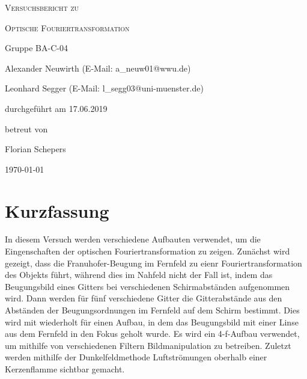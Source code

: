 \documentclass[
	a4paper,
	12pt,
	pagesize,
	ngerman
]{scrartcl}
\begin{document}
	\begin{titlepage}
		\centering
		{\scshape\LARGE Versuchsbericht zu \par}
		\vspace{1cm}
		{\scshape\huge Optische Fouriertransformation \par}
		\vspace{2.5cm}
		{\LARGE Gruppe BA-C-04 \par}
		\vspace{0.5cm}

		{\large Alexander Neuwirth (E-Mail: a\_neuw01@wwu.de) \par}
		{\large Leonhard Segger (E-Mail: l\_segg03@uni-muenster.de) \par}
		\vfill

		durchgeführt am 17.06.2019\par
		betreut von\par
		{\large Florian Schepers}

		\vfill

		{\large \today\par}
	\end{titlepage}
	\tableofcontents
	\newpage


	\section{Kurzfassung}
	In diesem Versuch werden verschiedene Aufbauten verwendet, um die Eingenschaften der optischen Fouriertransformation zu zeigen.
	Zunächst wird gezeigt, dass die Franuhofer-Beugung im Fernfeld zu eienr Fouriertransformation des Objekts führt, während dies im Nahfeld nicht der Fall ist, indem das Beugungsbild eines Gitters bei verschiedenen Schirmabständen aufgenommen wird.
	Dann werden für fünf verschiedene Gitter die Gitterabstände aus den Abständen der Beugungsordnungen im Fernfeld auf dem Schirm bestimmt.
	Dies wird mit wiederholt für einen Aufbau, in dem das Beugungsbild mit einer Linse aus dem Fernfeld in den Fokus geholt wurde. %
	Es wird ein 4-f-Aufbau verwendet, um mithilfe von verschiedenen Filtern Bildmanipulation zu betreiben.
	Zuletzt werden mithilfe der Dunkelfeldmethode Luftströmungen oberhalb einer Kerzenflamme sichtbar gemacht.
\end{document}
